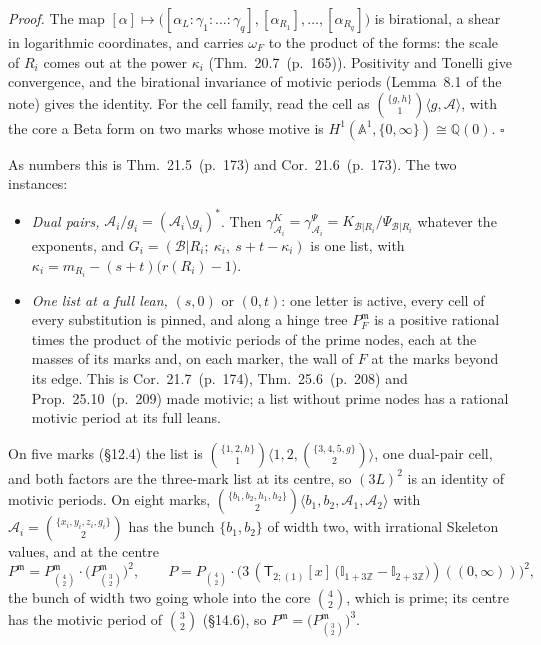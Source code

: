 \documentclass[11pt]{article}
\newcommand{\cB}{\mathcal B}
\newcommand{\sT}{\mathsf T}
\newcommand{\Ilat}[1]{\mathbb I_{#1}}
\newcommand{\Tx}[3]{(\sT_{#1;(1)}[x]\,#2)((#3,\infty))}
\newcommand{\hb}[2]{#1~(p.~#2)}   %
\theoremstyle{plain}
\theoremstyle{remark}
\begin{document}
\emph{Proof.} The map $[\alpha]\mapsto\big([\alpha_L:\gamma_1:\dots:\gamma_q],[\alpha_{R_1}],\dots,[\alpha_{R_q}]\big)$ is birational, a shear in logarithmic coordinates, and carries $\omega_F$ to the product of the forms: the scale of $R_i$ comes out at the power $\kappa_i$ (Thm.~\hb{20.7}{165}). Positivity and Tonelli give convergence, and the birational invariance of motivic periods (Lemma~8.1 of the note) gives the identity. For the cell family, read the cell as $\binom{\{g,h\}}1\langle g,\mathcal A\rangle$, with the core a Beta form on two marks whose motive is $H^1(\mathbb A^1,\{0,\infty\})\cong\mathbb Q(0)$. $\square$

As numbers this is Thm.~\hb{21.5}{173} and Cor.~\hb{21.6}{173}. The two instances:
\begin{itemize}
\item \emph{Dual pairs,} $\mathcal A_i/g_i=(\mathcal A_i\setminus g_i)^\ast$. Then $\gamma^K_{\mathcal A_i}=\gamma^\Psi_{\mathcal A_i}=K_{\cB|R_i}/\Psi_{\cB|R_i}$ whatever the exponents, and $G_i=(\cB|R_i;\ \kappa_i,\ s+t-\kappa_i)$ is one list, with $\kappa_i=m_{R_i}-(s+t)\big(r(R_i)-1\big)$.
\item \emph{One list at a full lean,} $(s,0)$ or $(0,t)$: one letter is active, every cell of every substitution is pinned, and along a hinge tree $P_F^{\mathfrak m}$ is a positive rational times the product of the motivic periods of the prime nodes, each at the masses of its marks and, on each marker, the wall of $F$ at the marks beyond its edge. This is Cor.~\hb{21.7}{174}, Thm.~\hb{25.6}{208} and Prop.~\hb{25.10}{209} made motivic; a list without prime nodes has a rational motivic period at its full leans.
\end{itemize}

On five marks (\S12.4) the list is $\binom{\{1,2,h\}}1\langle1,2,\binom{\{3,4,5,g\}}2\rangle$, one dual-pair cell, and both factors are the three-mark list at its centre, so $(3L)^2$ is an identity of motivic periods. On eight marks, $\binom{\{b_1,b_2,h_1,h_2\}}2\langle b_1,b_2,\mathcal A_1,\mathcal A_2\rangle$ with $\mathcal A_i=\binom{\{x_i,y_i,z_i,g_i\}}2$ has the bunch $\{b_1,b_2\}$ of width two, with irrational Skeleton values, and at the centre
\[
P^{\mathfrak m}=P^{\mathfrak m}_{\binom42}\cdot\big(P^{\mathfrak m}_{\binom32}\big)^2,\qquad P=P_{\binom42}\cdot\Big(3\,\Tx{2}{\big(\Ilat{1+3\mathbb Z}-\Ilat{2+3\mathbb Z}\big)}{0}\Big)^2,
\]
the bunch of width two going whole into the core $\binom42$, which is prime; its centre has the motivic period of $\binom32$ (\S14.6), so $P^{\mathfrak m}=\big(P^{\mathfrak m}_{\binom32}\big)^3$.
\end{document}

